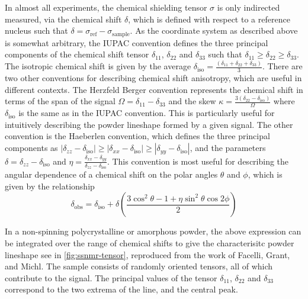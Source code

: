 \begin{refsection}
In almost all experiments, the chemical shielding tensor $\sigma$ is only indirected measured, via the chemical shift $\delta$, which is defined with respect to a reference nucleus such that $\delta = \sigma_{\textrm{ref}} - \sigma_{\textrm{sample}}$.
As the coordinate system as described above is somewhat arbitrary, the IUPAC convention defines the three principal components of the chemical shift tensor $\delta_{11}$, $\delta_{22}$ and $\delta_{33}$ such that $\delta_{11} \geq \delta_{22} \geq \delta_{33}$.
The isotropic chemical shift is given by the average $\delta_{\textrm{iso}} = \frac{(\delta_{11} + \delta_{22} + \delta_{33})}{3}$.
There are two other conventions for describing chemical shift anisotropy, which are useful in different contexts.
The Herzfeld Berger convention represents the chemical shift in terms of the span of the signal $\Omega = \delta_{11} - \delta_{33}$ and the skew $\kappa = \frac{3(\delta_{22} - \delta_{\textrm{iso}})}{\Omega}$ where $\delta_{\textrm{iso}}$ is the same as in the IUPAC convention.
This is particularly useful for intuitively describing the powder lineshape formed by a given signal.
The other convention is the Haeberlen convention, which defines the three principal components as $|\delta_{zz} - \delta_{\textrm{iso}}| \geq |\delta_{xx} - \delta_{\textrm{iso}}| \geq |\delta_{yy} - \delta_{\textrm{iso}}|$, and the parameters $\delta = \delta_{zz} -\delta_{\textrm{iso}}$ and $\eta = \frac{\delta_{xx} - \delta_{yy}}{\delta_{zz} -\delta_{\textrm{iso}}}$.
This convention is most useful for describing the angular dependence of a chemical shift on the polar angles $\theta$ and $\phi$, which is given by the relationship\autocite{Haeberlen1976}
\begin{equation}
  \delta_{\textrm{obs}} = \delta_{\textrm{iso}} + \delta \left(\frac{3 \cos^2 \theta - 1 + \eta \sin^2 \theta \cos 2 \phi}{2} \right)
  \label{eqn:orientation-csa}
\end{equation}

In a non-spinning polycrystalline or amorphous powder, the above expression can be integrated over the range of chemical shifts to give the characterisitc powder lineshape see in \cref{fig:ssnmr-tensor}, reproduced from the work of Facelli, Grant, and Michl.\autocite{Facelli1987Carbon-13Determination}
The sample consists of randomly oriented tensors, all of which contribute to the signal.
The principal values of the tensor $\delta_{11}$, $\delta_{22}$ and $\delta_{33}$ correspond to the two extrema of the line, and the central peak.


\end{refsection}
